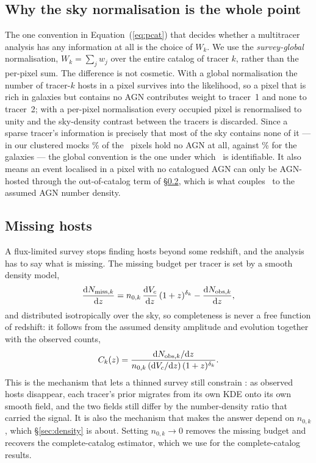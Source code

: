 \subsection{Why the sky normalisation is the whole point}
\label{sec:methods:field}

The one convention in Equation~(\ref{eq:pcat}) that decides whether a
multitracer analysis has any information at all is the choice of $W_k$. We use
the \emph{survey-global} normalisation, $W_k = \sum_j w_j$ over the entire
catalog of tracer $k$, rather than the per-pixel sum. The difference is not
cosmetic. With a global normalisation the number of tracer-$k$ hosts in a pixel
survives into the likelihood, so a pixel that is rich in galaxies but contains
no AGN contributes weight to tracer~1 and none to tracer~2; with a per-pixel
normalisation every occupied pixel is renormalised to unity and the sky-density
contrast between the tracers is discarded. Since a sparse tracer's information
is precisely that most of the sky contains none of it --- in our clustered mocks
\GlassAgnEmptyPix\% of the \GlassNpix\ pixels hold no AGN at all, against
\GlassGalEmptyPix\% for the galaxies --- the global convention is the one under
which \fagn\ is identifiable. It also means an event localised in a pixel with
no catalogued AGN can only be AGN-hosted through the out-of-catalog term of
\S\ref{sec:methods:completion}, which is what couples \fagn\ to the assumed AGN
number density.

\subsection{Missing hosts}
\label{sec:methods:completion}

A flux-limited survey stops finding hosts beyond some redshift, and the
analysis has to say what is missing. The missing budget per tracer is set by a
smooth density model,
\begin{equation}
  \frac{\mathrm{d} N_{{\rm miss},k}}{\mathrm{d} z} =
    n_{0,k}\, \frac{\mathrm{d} V_c}{\mathrm{d} z}\, (1+z)^{\delta_k}
    - \frac{\mathrm{d} N_{{\rm obs},k}}{\mathrm{d} z},
  \label{eq:miss}
\end{equation}
and distributed isotropically over the sky, so completeness is never a free
function of redshift: it follows from the assumed density amplitude and
evolution together with the observed counts,
\begin{equation}
  C_k(z) = \frac{\mathrm{d} N_{{\rm obs},k}/\mathrm{d} z}
                {n_{0,k}\, (\mathrm{d} V_c/\mathrm{d} z)\, (1+z)^{\delta_k}}.
  \label{eq:completeness}
\end{equation}
This is the mechanism that lets a thinned survey still constrain \fagn: as
observed hosts disappear, each tracer's prior migrates from its own KDE onto its
own smooth field, and the two fields still differ by the number-density ratio
that carried the signal. It is also the mechanism that makes the answer depend
on $n_{0,k}$, which \S\ref{sec:density} is about. Setting
$n_{0,k} \rightarrow 0$ removes the missing budget and recovers the
complete-catalog estimator, which we use for the complete-catalog results.


